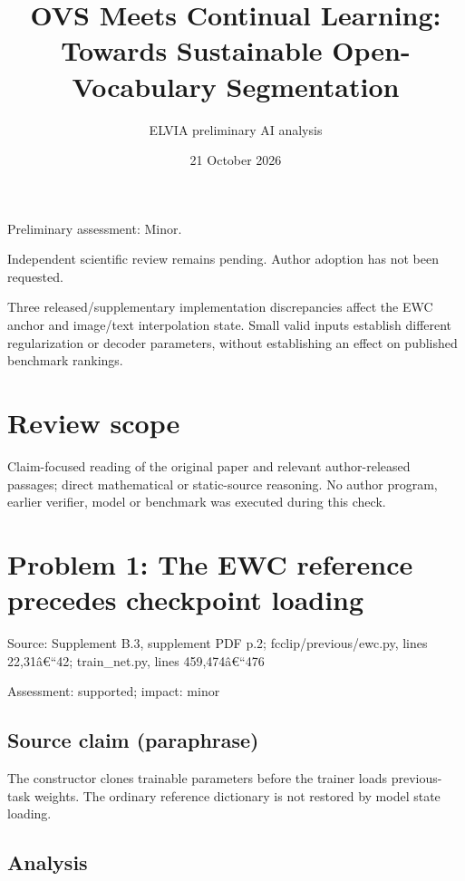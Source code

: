 \documentclass[11pt]{article}
\begin{document}
\title{OVS Meets Continual Learning: Towards Sustainable Open-Vocabulary Segmentation}

\author{ELVIA preliminary AI analysis}\date{21 October 2026}\maketitle

Preliminary assessment: Minor.\par

Independent scientific review remains pending. Author adoption has not been requested.

Three released/supplementary implementation discrepancies affect the EWC anchor and image/text interpolation state. Small valid inputs establish different regularization or decoder parameters, without establishing an effect on published benchmark rankings.

\section*{Review scope}

Claim-focused reading of the original paper and relevant author-released passages; direct mathematical or static-source reasoning. No author program, earlier verifier, model or benchmark was executed during this check.

\section*{Problem 1: The EWC reference precedes checkpoint loading}

Source: Supplement B.3, supplement PDF p.2; fcclip/previous/ewc.py, lines 22,31â€“42; train\_net.py, lines 459,474â€“476

Assessment: supported; impact: minor

\subsection*{Source claim (paraphrase)}

The constructor clones trainable parameters before the trainer loads previous-task weights. The ordinary reference dictionary is not restored by model state loading.

\subsection*{Analysis}
\end{document}
